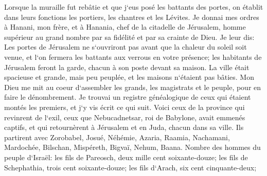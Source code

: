 \verse Lorsque la muraille fut rebâtie et que j`eus posé les battants des portes, on établit dans leurs fonctions les portiers, les chantres et les Lévites. 
\verse Je donnai mes ordres à Hanani, mon frère, et à Hanania, chef de la citadelle de Jérusalem, homme supérieur au grand nombre par sa fidélité et par sa crainte de Dieu. 
\verse Je leur dis: Les portes de Jérusalem ne s`ouvriront pas avant que la chaleur du soleil soit venue, et l`on fermera les battants aux verrous en votre présence; les habitants de Jérusalem feront la garde, chacun à son poste devant sa maison. 
\verse La ville était spacieuse et grande, mais peu peuplée, et les maisons n`étaient pas bâties. 
\verse Mon Dieu me mit au coeur d`assembler les grands, les magistrats et le peuple, pour en faire le dénombrement. Je trouvai un registre généalogique de ceux qui étaient montés les premiers, et j`y vis écrit ce qui suit. 
\verse Voici ceux de la province qui revinrent de l`exil, ceux que Nebucadnetsar, roi de Babylone, avait emmenés captifs, et qui retournèrent à Jérusalem et en Juda, chacun dans sa ville. 
\verse Ils partirent avec Zorobabel, Josué, Néhémie, Azaria, Raamia, Nachamani, Mardochée, Bilschan, Mispéreth, Bigvaï, Nehum, Baana. Nombre des hommes du peuple d`Israël: 
\verse les fils de Pareosch, deux mille cent soixante-douze; 
\verse les fils de Schephathia, trois cent soixante-douze; 
\verse les fils d`Arach, six cent cinquante-deux; 
